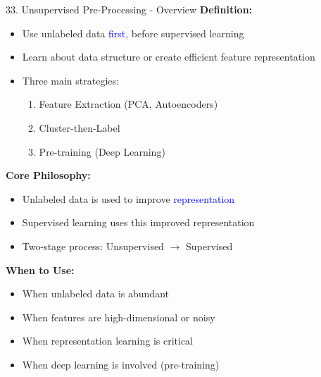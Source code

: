 \documentclass[8pt]{beamer}
\begin{document}
	\begin{frame}{33. Unsupervised Pre-Processing - Overview}
		\fontsize{6.5}{7.5}\selectfont
		\textbf{Definition:}
		\begin{itemize}
			\item Use unlabeled data \textcolor{blue}{first}, before supervised learning
			\item Learn about data structure or create efficient feature representation
			\item Three main strategies:
			\begin{enumerate}
				\item Feature Extraction (PCA, Autoencoders)
				\item Cluster-then-Label
				\item Pre-training (Deep Learning)
			\end{enumerate}
		\end{itemize}
		
		\textbf{Core Philosophy:}
		\begin{itemize}
			\item Unlabeled data is used to improve \textcolor{blue}{representation}
			\item Supervised learning uses this improved representation
			\item Two-stage process: Unsupervised $\rightarrow$ Supervised
		\end{itemize}
		
		\textbf{When to Use:}
		\begin{itemize}
			\item When unlabeled data is abundant
			\item When features are high-dimensional or noisy
			\item When representation learning is critical
			\item When deep learning is involved (pre-training)
		\end{itemize}
	\end{frame}
	
\end{document}
